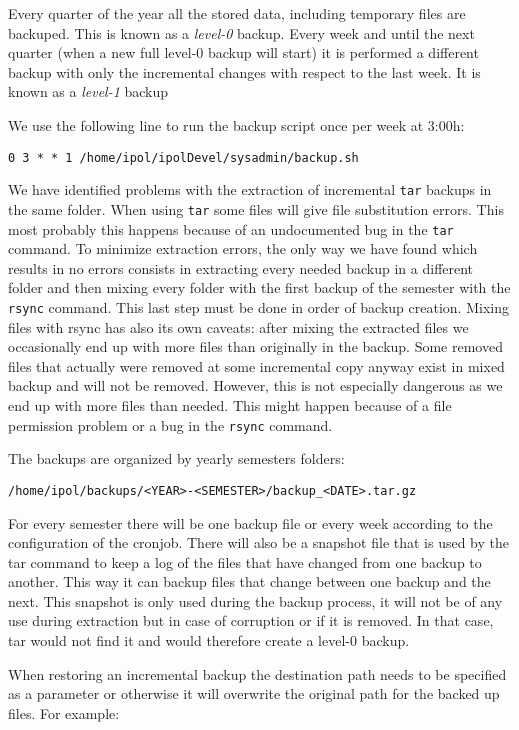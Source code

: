 \documentclass[a4paper,12pt]{article}
\begin{document}
Every quarter of the year all the stored data, including temporary files are backuped. This is known as a \emph{level-0} backup. Every week and until the next quarter (when a new full level-0 backup will start) it is performed  a different backup with only the incremental changes with respect to the last week. It is known as a \emph{level-1} backup

We use the following line to run the backup script once per week at 3:00h:

{\tt 0 3 * * 1 /home/ipol/ipolDevel/sysadmin/backup.sh}

We have identified problems with the extraction of incremental {\tt tar} backups in the same folder. When using {\tt tar} some files will give file substitution errors. This most probably this happens because of an undocumented bug in the {\tt tar} command. To minimize extraction errors, the only way we have found which results in no errors consists in extracting every needed backup in a different folder and then mixing every folder with the first backup of the semester with the {\tt rsync} command. This last step must be done in order of backup creation. Mixing files with rsync has also its own caveats: after mixing the extracted files we occasionally end up with more files than originally in the backup. Some removed files that actually were removed at some incremental copy anyway exist in mixed backup and will not be removed. However, this is not especially dangerous as we end up with more files than needed. This might happen because of a file permission problem or a bug in the {\tt rsync} command.

The backups are organized by yearly semesters folders:

{\tt /home/ipol/backups/<YEAR>-<SEMESTER>/backup\_<DATE>.tar.gz}

For every semester there will be one backup file or every week according to the configuration of the cronjob. There will also be a snapshot file that is used by the tar command to keep a log of the files that have changed from one backup to another. This way it can backup files that change between one backup and the next. This snapshot is only used during the backup process, it will not be of any use during extraction but in case of corruption or if it is removed. In that case, tar would not find it and would therefore create a level-0 backup. 

When restoring an incremental backup the destination path needs to be specified as a parameter or otherwise it will overwrite the original path for the backed up files. For example:
\end{document}
